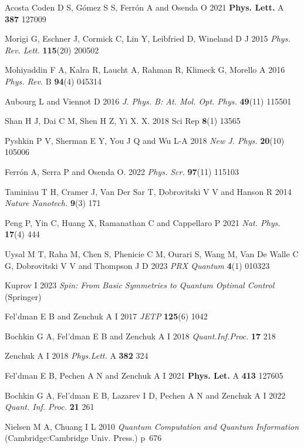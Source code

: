 \documentclass[pra,preprint,showpacs]{revtex4-1}
\begin{document}
{{\begin{thebibliography}{99}
 Acosta Coden D S, G\'omez S S, Ferr\'on A and Osenda O
 2021 {\bf Phys. Lett.} A {\bf 387} 127009

 Morigi G, Eschner J, Cormick C, Lin Y, Leibfried D, Wineland D J
2015 {\it Phys. Rev. Lett.} {\bf 115}(20) 200502

 Mohiyaddin F A, Kalra R, Laucht A, Rahman R, Klimeck G, Morello A
2016 {\it Phys. Rev.} B  {\bf 94}(4) 045314

 Aubourg L and Viennot D
2016 {\it J. Phys. B: At. Mol. Opt. Phys.}  {\bf 49}(11) 115501

 Shan H J, Dai C M, Shen H Z, Yi X. X.
2018 Sci Rep  {\bf 8}(1) 13565

 Pyshkin P V, Sherman E Y, You J Q and Wu L-A
 2018 {\it New J. Phys.}  {\bf 20}(10) 105006


 Ferr\'on A, Serra P and Osenda O.
2022 {\it Phys. Scr.}  {\bf 97}(11) 115103

 Taminiau T H, Cramer J, Van Der Sar T, Dobrovitski V V and Hanson R
2014 {\it Nature Nanotech.}  {\bf 9}(3) 171

 Peng P, Yin C, Huang X, Ramanathan C and  Cappellaro P
2021 {\it Nat. Phys.}  {\bf 17}(4) 444

 Uysal M T, Raha M, Chen S, Phenicie C M, Ourari S, Wang M, Van De Walle C G, Dobrovitski V V and Thompson J D 2023
 {\it PRX Quantum}  {\bf 4}(1) 010323

Kuprov I 2023 {\it Spin: From Basic Symmetries to Quantum Optimal Control}  (Springer)


Fel'dman E B and Zenchuk A I
2017 {\it JETP} {\bf 125}(6)  1042

Bochkin G A, Fel'dman E B and  Zenchuk A I
2018 {\it Quant.Inf.Proc.} {\bf 17} 218

Zenchuk A I
2018 {\it Phys.Lett.} A {\bf 382}  324

Fel'dman E B,  Pechen A N and Zenchuk A I
2021 {\bf Phys. Let.} A {\bf 413} 127605

Bochkin G A, Fel'dman E B, Lazarev I D, Pechen A N and
Zenchuk A I
2022 {\it Quant. Inf. Proc.} {\bf 21}
 261

Nielsen M A,  Chuang I L   2010
{\it Quantum Computation and Quantum Information}
(Cambridge:Cambridge Univ. Press.) p~676


\end{thebibliography}}}
\end{document}
